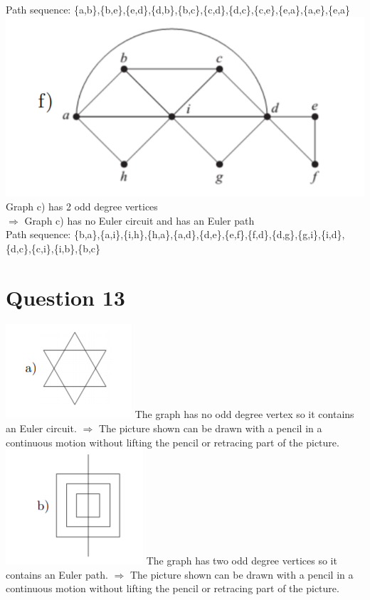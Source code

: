 \documentclass{article}
\begin{document}
Path sequence: \{a,b\},\{b,e\},\{e,d\},\{d,b\},\{b,c\},\{c,d\},\{d,c\},\{c,e\},\{e,a\},\{a,e\},\{e,a\}
\newline
\includegraphics[]{Question 12/connectivity_12.f.png}
\newline
Graph c) has 2 odd degree vertices\\
$\Rightarrow$ Graph c) has no Euler circuit and has an Euler path\\
Path sequence: \{b,a\},\{a,i\},\{i,h\},\{h,a\},\{a,d\},\{d,e\},\{e,f\},\{f,d\},\{d,g\},\{g,i\},\{i,d\},\{d,c\},\{c,i\},\{i,b\},\{b,c\}

\section*{Question 13}
\includegraphics[]{Question 13/connectivity_13.a.png}
\newline
The graph has no odd degree vertex so it contains an Euler circuit.
$\Rightarrow$ The picture shown can be drawn with a pencil in a continuous motion without lifting the pencil or retracing part of the picture.
\newline
\includegraphics[]{Question 13/connectivity_13.b.png}
\newline
The graph has two odd degree vertices so it contains an Euler path.
$\Rightarrow$ The picture shown can be drawn with a pencil in a continuous motion without lifting the pencil or retracing part of the picture.
\end{document}
